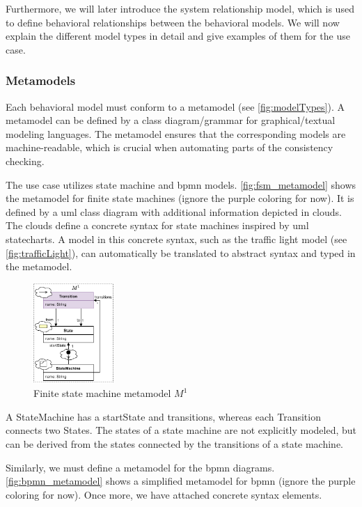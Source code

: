 \documentclass{jot}
\begin{document}
Furthermore, we will later introduce the system relationship model, which is used to define behavioral relationships between the behavioral models.
We will now explain the different model types in detail and give examples of them for the use case.

\subsubsection{Metamodels}
Each behavioral model must conform to a metamodel (see \autoref{fig:modelTypes}).
A metamodel can be defined by a class diagram/grammar for graphical/textual modeling languages.
The metamodel ensures that the corresponding models are machine-readable, which is crucial when automating parts of the consistency checking.

The use case utilizes state machine and \gls*{bpmn} models.
\autoref{fig:fsm_metamodel} shows the metamodel for finite state machines (ignore the purple coloring for now).
It is defined by a \gls*{uml} class diagram with additional information depicted in clouds.
The clouds define a concrete syntax for state machines inspired by \gls*{uml} statecharts.
A model in this concrete syntax, such as the traffic light model (see \autoref{fig:trafficLight}), can automatically be translated to abstract syntax and typed in the metamodel.

\begin{figure}[h]
    \centering
    \includegraphics[width=0.275\textwidth]{figures/state_machine_metamodel.pdf}
    \caption{Finite state machine metamodel $M^1$}
    \label{fig:fsm_metamodel}
\end{figure}

A \textsf{StateMachine} has a \textsf{startState} and \textsf{transitions}, whereas each \textsf{Transition} connects two \textsf{State}s.
The states of a state machine are not explicitly modeled, but can be derived from the states connected by the transitions of a state machine.

Similarly, we must define a metamodel for the \gls*{bpmn} diagrams.
\autoref{fig:bpmn_metamodel} shows a simplified metamodel for \gls*{bpmn} (ignore the purple coloring for now).
Once more, we have attached concrete syntax elements.
\end{document}
